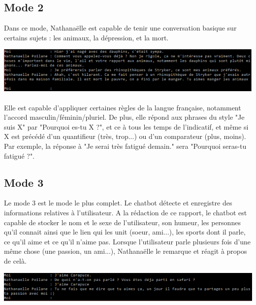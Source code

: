 \documentclass[paper=a4, fontsize=11pt]{article}
\begin{document}
\subsection{Mode 2}

Dans ce mode, Nathanaëlle est capable de tenir une conversation basique sur certains sujets : les animaux, la dépression, et la mort. 

\begin{center}
\includegraphics{rhinopdauph.PNG}
\end{center}

\paragraph{} Elle est capable d'appliquer certaines règles de la langue française, notamment l'accord masculin/féminin/pluriel. De plus, elle répond aux phrases du style "Je suis X" par "Pourquoi es-tu X ?", et ce à tous les temps de l'indicatif, et même si X est précédé d'un quantifieur (très, trop...) ou d'un comparateur (plus, moins). Par exemple, la réponse à "Je serai très fatigué demain." sera "Pourquoi seras-tu fatigué ?".

\subsection{Mode 3}

Le mode 3 est le mode le plus complet. Le chatbot détecte et enregistre des informations relatives à l'utilisateur. A la rédaction de ce rapport, le chatbot est capable de stocker le nom et le sexe de l'utilisateur, son humeur, les personnes qu'il connait ainsi que le lien qui les unit (soeur, ami...), les sports dont il parle, ce qu'il aime et ce qu'il n'aime pas. Lorsque l'utilisateur parle plusieurs fois d'une même chose (une passion, un ami...), Nathanaëlle le remarque et réagit à propos de celà.
\begin{center}
\includegraphics{carapuce.PNG}
\end{center}
\end{document}
